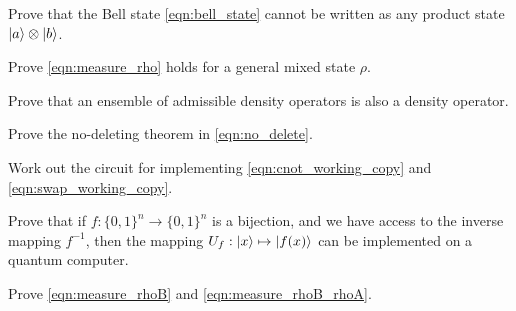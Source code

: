 \begin{exer}\label{exer:bell}
  Prove that the Bell state \cref{eqn:bell_state} cannot be written as any product state $\ket{a}\otimes\ket{b}$.
\end{exer}

\begin{exer}
  Prove \cref{eqn:measure_rho} holds for a general mixed state $\rho$.
\end{exer}

\begin{exer}
Prove that an ensemble of admissible density operators is also a density operator.
\end{exer}

\begin{exer}\label{exer:no_delete}
Prove the no-deleting theorem in \cref{eqn:no_delete}.
\end{exer}


\begin{exer}
Work out the circuit for implementing \cref{eqn:cnot_working_copy} and \cref{eqn:swap_working_copy}.
\end{exer}


\begin{exer}\label{exer:implement_reversible}
  Prove that if $f:\{0,1\}^n\to\{0,1\}^n$ is a bijection, and we have access to the inverse mapping $f^{-1}$, then the mapping $U_f:\ket{x}\mapsto \ket{f(x)}$ can be implemented on a quantum computer.
\end{exer}

\begin{exer}
Prove \cref{eqn:measure_rhoB} and \cref{eqn:measure_rhoB_rhoA}.
\end{exer}
